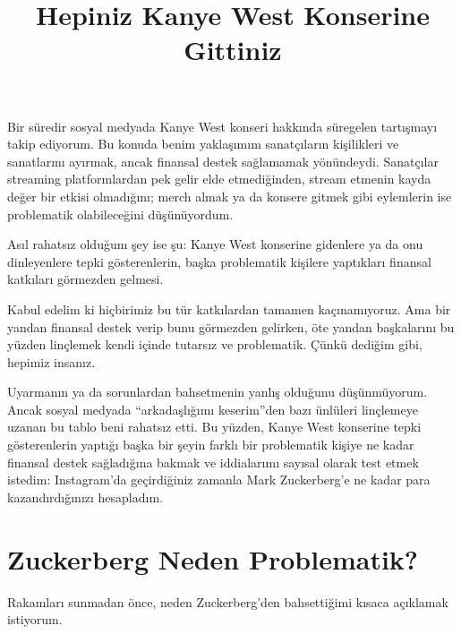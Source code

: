 \documentclass{article}
\title{\textbf{Hepiniz Kanye West Konserine Gittiniz}}
\date{}
\begin{document}
\maketitle

Bir süredir sosyal medyada Kanye West konseri hakkında süregelen tartışmayı takip ediyorum. Bu konuda benim yaklaşımım sanatçıların kişilikleri ve sanatlarını ayırmak, ancak finansal destek sağlamamak yönündeydi. Sanatçılar streaming platformlardan pek gelir elde etmediğinden, stream etmenin kayda değer bir etkisi olmadığını; merch almak ya da konsere gitmek gibi eylemlerin ise problematik olabileceğini düşünüyordum.

Asıl rahatsız olduğum şey ise şu: Kanye West konserine gidenlere ya da onu dinleyenlere tepki gösterenlerin, başka problematik kişilere yaptıkları finansal katkıları görmezden gelmesi.

Kabul edelim ki hiçbirimiz bu tür katkılardan tamamen kaçınamıyoruz. Ama bir yandan finansal destek verip bunu görmezden gelirken, öte yandan başkalarını bu yüzden linçlemek kendi içinde tutarsız ve problematik. Çünkü dediğim gibi, hepimiz insanız.

Uyarmanın ya da sorunlardan bahsetmenin yanlış olduğunu düşünmüyorum. Ancak sosyal medyada ``arkadaşlığımı keserim''den bazı ünlüleri linçlemeye uzanan bu tablo beni rahatsız etti. Bu yüzden, Kanye West konserine tepki gösterenlerin yaptığı başka bir şeyin farklı bir problematik kişiye ne kadar finansal destek sağladığına bakmak ve iddialarımı sayısal olarak test etmek istedim: Instagram'da geçirdiğiniz zamanla Mark Zuckerberg'e ne kadar para kazandırdığınızı hesapladım.

\section*{Zuckerberg Neden Problematik?}

Rakamları sunmadan önce, neden Zuckerberg'den bahsettiğimi kısaca açıklamak istiyorum.
\end{document}
